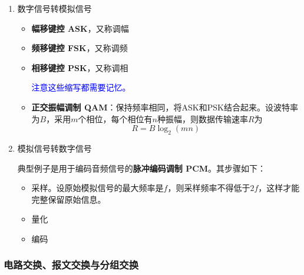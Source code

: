 \documentclass[12pt, a4paper, oneside]{ctexart}
\begin{document}
\begin{enumerate}
    \item 数字信号转模拟信号
    \begin{itemize}
        \item {\bf 幅移键控 ASK}，又称调幅
        \item {\bf 频移键控 FSK}，又称调频
        \item {\bf 相移键控 PSK}，又称调相
        
        \textcolor{blue}{注意这些缩写都需要记忆。}

        \item {\bf 正交振幅调制 QAM}：保持频率相同，将ASK和PSK结合起来。设波特率为$B$，采用$m$个相位，每个相位有$n$种振幅，则数据传输速率$R$为
        \begin{equation}
            R=B\log_2 (mn)
        \end{equation}
    \end{itemize}

    \item 模拟信号转数字信号
    
    典型例子是用于编码音频信号的\textbf{脉冲编码调制 PCM}。其步骤如下：

    \begin{itemize}
        \item 采样。设原始模拟信号的最大频率是$f$，则采样频率不得低于$2f$，这样才能完整保留原始信息。
        \item 量化
        \item 编码
    \end{itemize}
\end{enumerate}

\subsubsection{电路交换、报文交换与分组交换}
\end{document}
